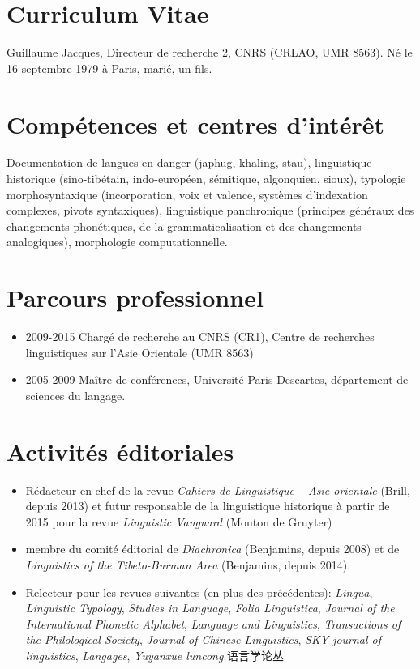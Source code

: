 \documentclass[oldfontcommands,oneside,a4paper,11pt]{article}
\newcommand{\zh}[1]{{\cn #1}}
\begin{document}
 \sloppy
\section*{{\LARGE Curriculum Vitae}}
Guillaume Jacques, Directeur de recherche 2, CNRS (CRLAO, UMR 8563).  Né le 16 septembre 1979 à Paris, marié, un fils.
\sloppy
\section*{Compétences et centres d’intérêt}
Documentation de langues en danger (japhug, khaling, stau), linguistique historique (sino-tibétain, indo-européen, sémitique, algonquien, sioux), typologie morphosyntaxique (incorporation, voix et valence, systèmes d'indexation complexes, pivots syntaxiques), linguistique panchronique (principes généraux des changements phonétiques, de la grammaticalisation et des changements analogiques), morphologie computationnelle.


\section*{Parcours professionnel}
\begin{itemize}
\item 2009-2015 Chargé de recherche au CNRS (CR1), Centre de recherches linguistiques sur l'Asie Orientale (UMR 8563)
\item 2005-2009 Maître de conférences, Université Paris Descartes, département de sciences du langage.
\end{itemize}
 
\section*{Activités éditoriales}
\begin{itemize}
\item Rédacteur en chef de la revue \textit{Cahiers de Linguistique -- Asie orientale} (Brill, depuis 2013) et futur responsable de la linguistique historique à partir de 2015 pour la revue \textit{Linguistic Vanguard} (Mouton de Gruyter)
\item membre du comité éditorial de \textit{Diachronica} (Benjamins, depuis 2008) et de \textit{Linguistics of the Tibeto-Burman Area}  (Benjamins, depuis 2014).
\item Relecteur pour les revues suivantes (en plus des précédentes): \textit{Lingua}, \textit{Linguistic Typology}, \textit{Studies in Language}, \textit{Folia Linguistica}, \textit{Journal of the International Phonetic Alphabet},  \textit{Language and Linguistics}, \textit{Transactions of the Philological Society}, \textit{Journal of Chinese Linguistics}, \textit{SKY journal of linguistics}, \textit{Langages}, \textit{Yuyanxue luncong} \zh{语言学论丛}
\end{itemize}
\end{document}
